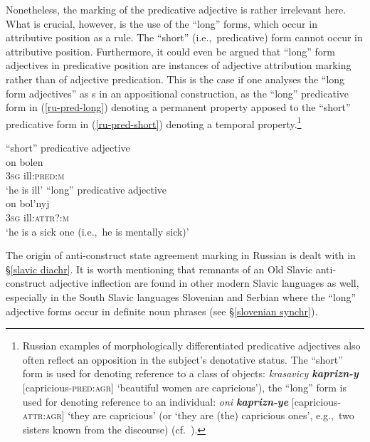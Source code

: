 Nonetheless, the marking of the predicative adjective is rather irrelevant here. What is crucial, however, is the use of the “long” forms, which occur in attributive position as a rule. The “short” (i.e.,~predicative) form cannot occur in attributive position. Furthermore, it could even be argued that “long” form adjectives in predicative position are instances of adjective attribution marking rather than of adjective predication. This is the case if one analyses the “long form adjectives” as s in an appositional construction, as the “long” predicative form in (\ref{ru-pred-long}) denoting a permanent property apposed to the “short” predicative form in (\ref{ru-pred-short}) denoting a temporal property.\footnote{Russian examples of morphologically differentiated predicative adjectives also often reflect an opposition in the subject's denotative status. The “short” form is used for denoting reference to a class of objects: \textit{krasavicy \textbf{kaprizn-y}} [capricious-\textsc{pred:agr}] ‘beautiful women are capricious’), the “long” form is used for denoting reference to an individual: \textit{oni \textbf{kaprizn-ye}} [capricious-\textsc{attr:agr}] ‘they are capricious’ (or ‘they are (the) capricious ones’, e.g.,~two sisters known from the discourse) (cf.~\citealt[210 Footnote 76]{mendoza2004}).}
\begin{exe}
\ex
{}
\begin{xlist}
\ex \rm{“short” predicative adjective}\\
\gll on bolen\\
	3\textsc{sg} ill:\textsc{pred:m}\\
\glt	 ‘he is ill’\label{ru-pred-short}
\ex \rm{“long” predicative adjective}\\
\gll on bol'nyj\\
	3\textsc{sg} ill:\textsc{attr?:m}\\
\glt	 ‘he is a sick one (i.e.,~he is mentally sick)’\label{ru-pred-long}
\end{xlist}
\end{exe}
The origin of anti\hyp{}construct state agreement marking in Russian is dealt with in \S\ref{slavic diachr}. It is worth mentioning that remnants of an Old Slavic anti\hyp{}construct adjective inflection are found in other modern Slavic languages as well, especially in the South Slavic languages Slovenian and Serbian where the “long” adjective forms occur in definite noun phrases (see \S\ref{slovenian synchr}).

